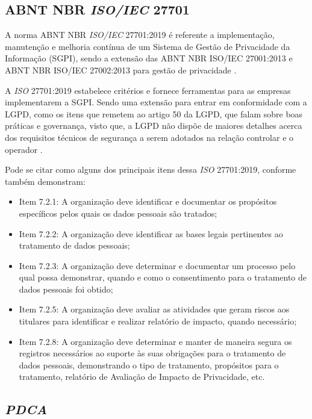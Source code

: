 \documentclass[
	12pt,				%
	openright,			%
	oneside,			%
	a4paper,			%
	english,			%
	french,				%
	spanish,			%
	brazil,				%
	]{abntex2}
\begin{document}
\subsection{ABNT NBR \textit{ISO/IEC} 27701 }

A norma ABNT NBR \textit{ISO/IEC} 27701:2019 é referente a implementação, manutenção e melhoria contínua de um Sistema de Gestão de Privacidade da Informação (SGPI), sendo a extensão das ABNT NBR ISO/IEC 27001:2013 e ABNT NBR ISO/IEC 27002:2013 para gestão de privacidade \cite{abnt}.

A \textit{ISO} 27701:2019 estabelece critérios e fornece ferramentas para as empresas implementarem a SGPI.  Sendo uma extensão para entrar em conformidade com a LGPD, como os itens que remetem ao artigo 50 da LGPD, que falam sobre boas práticas e governança, visto que, a LGPD não dispõe de maiores detalhes acerca dos requisitos técnicos de segurança a serem adotados na relação controlar e o operador \cite{lgpd1alves}. 

 Pode se citar como alguns dos principais itens dessa \textit{ISO} 27701:2019, conforme também \cite{Vainzof2020} demonstram:
\begin{itemize}
\item Item 7.2.1: A organização deve identificar e documentar os propósitos específicos pelos quais os dados pessoais são tratados;
\item Item 7.2.2: A organização deve identificar as bases legais pertinentes ao tratamento de dados pessoais;
\item Item 7.2.3: A organização deve determinar e documentar um processo pelo qual possa demonstrar, quando e como o consentimento para o  tratamento de dados pessoais foi obtido;
\item Item 7.2.5: A organização deve avaliar as atividades que geram riscos aos titulares para identificar e realizar relatório de impacto, quando necessário;
\item Item 7.2.8: A organização deve determinar e manter de maneira segura os registros necessários ao suporte às suas obrigações para o tratamento de dados pessoais, demonstrando o tipo de tratamento, propósitos para o tratamento, relatório de Avaliação de Impacto de Privacidade, etc.
\end{itemize}

\subsection{ \textit{PDCA} }
\end{document}
